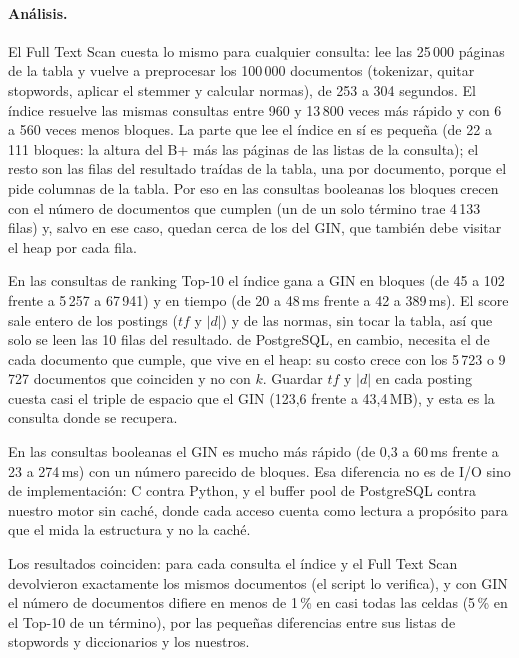 \paragraph{Análisis.} El Full Text Scan cuesta lo mismo para cualquier consulta: lee las
25\,000 páginas de la tabla y vuelve a preprocesar los 100\,000 documentos (tokenizar, quitar
stopwords, aplicar el stemmer y calcular normas), de 253 a 304 segundos. El índice resuelve las
mismas consultas entre 960 y 13\,800 veces más rápido y con 6 a 560 veces menos bloques. La
parte que lee el índice en sí es pequeña (de 22 a 111 bloques: la altura del B+ más las
páginas de las listas de la consulta); el resto son las filas del resultado traídas de la
tabla, una por documento, porque el  pide columnas de la tabla. Por eso en
las consultas booleanas los bloques crecen con el número de documentos que cumplen (un
 de un solo término trae 4\,133 filas) y, salvo en ese caso, quedan cerca de los
del GIN, que también debe visitar el heap por cada fila.

En las consultas de ranking Top-10 el índice gana a GIN en bloques (de 45 a 102 frente a
5\,257 a 67\,941) y en tiempo (de 20 a 48\,ms frente a 42 a 389\,ms). El score sale entero de
los postings ($tf$ y $|d|$) y de las normas, sin tocar la tabla, así que solo se leen las
10 filas del resultado.  de PostgreSQL, en cambio, necesita el
 de cada documento que cumple, que vive en el heap: su costo crece con los
5\,723 o 9\,727 documentos que coinciden y no con $k$. Guardar $tf$ y $|d|$ en cada posting
cuesta casi el triple de espacio que el GIN (123,6 frente a 43,4\,MB), y esta es la consulta
donde se recupera.

En las consultas booleanas el GIN es mucho más rápido (de 0,3 a 60\,ms frente a 23 a 274\,ms)
con un número parecido de bloques. Esa diferencia no es de I/O sino de implementación: C
contra Python, y el buffer pool de PostgreSQL contra nuestro motor sin caché, donde cada
acceso cuenta como lectura a propósito para que el  mida la estructura y
no la caché.

Los resultados coinciden: para cada consulta el índice y el Full Text Scan devolvieron
exactamente los mismos documentos (el script lo verifica), y con GIN el número de
documentos difiere en menos de 1\,\% en casi todas las celdas (5\,\% en el Top-10 de un
término), por las pequeñas diferencias entre sus listas de
stopwords y diccionarios y los nuestros.
